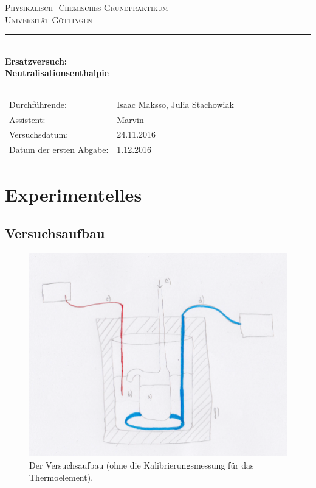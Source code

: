 \documentclass[12pt,a4paper,titlepage,headinclude,bibtotoc]{scrartcl}
\begin{document}
\begin{titlepage}
\centering
\textsc{\Large Physikalisch- Chemisches Grundpraktikum\\[1.5ex] Universität Göttingen}

\vspace*{0.5cm}

\rule{\textwidth}{1pt}\\[0.5cm]
{\huge \bfseries
  Ersatzversuch: \\[1.5ex]
Neutralisationsenthalpie }\\[0.5cm]
\rule{\textwidth}{1pt}

\vspace*{0.5cm}


\begin{Large}
\begin{tabular}{ll}
Durchführende: &  Isaac Maksso, Julia Stachowiak\\
Assistent: & Marvin \\
 Versuchsdatum: & 24.11.2016\\
 Datum der ersten Abgabe: & 1.12.2016\\
\end{tabular}
\end{Large}

\vspace*{0.5cm}

\end{titlepage}


\tableofcontents

\section{Experimentelles}
\subsection{Versuchsaufbau}


\begin{figure}[h]
\centering
\includegraphics[scale=1]{Versuchsbau.png}
\caption{Der Versuchsaufbau (ohne die Kalibrierungsmessung für das Thermoelement).}
\end{figure} 
\FloatBarrier
\end{document}
